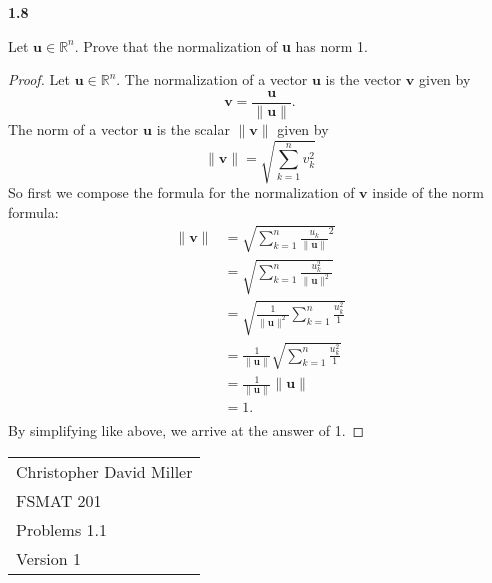 \documentclass[12pt]{article}
\begin{document}
\textbf{1.8} \\  %
\begin{prop}
Let $\mathbf{u} \in \mathbb{R}^n$. Prove that the normalization of \textbf{u} has norm 1.
\end{prop}
\begin{proof}
    Let $\mathbf{u} \in \mathbb{R}^n$.
    The normalization of a vector $\mathbf{u}$ is the vector $\mathbf{v}$ given by   
    \[\mathbf{v} = \frac{\mathbf{u}}{\| \mathbf{u} \|}.\] 
    The norm of a vector $\mathbf{u}$ is the scalar $\|  \mathbf{v} \|$ given by   
    $$\|  \mathbf{v} \| = \sqrt{\sum_{k=1}^{n}v_k^2}$$ 
    So first we compose the formula for the normalization of $\mathbf{v}$ inside of the norm formula:
        \begin{align*}
          \|  \mathbf{v} \| &=  \sqrt{\sum_{k=1}^{n}\frac{u_k}{\| \mathbf{u} \|}^2} \\ 
                            &=  \sqrt{\sum_{k=1}^{n}\frac{u_k^2}{\| \mathbf{u} \|^2}} \\ 
                            &=  \sqrt{\frac{1}{\| \mathbf{u} \|^2}\sum_{k=1}^{n}\frac{u_k^2}{1}} \\
                            &=  \frac{1}{\| \mathbf{u} \|}\sqrt{\sum_{k=1}^{n}\frac{u_k^2}{1}} \\
                            &=  \frac{1}{\| \mathbf{u} \|} \| \mathbf{u} \| \\
                            &=  1. \\
        \end{align*}
        By simplifying like above, we arrive at the answer of 1.  
\end{proof}
\newpage
\begin{flushright}
    \begin{tabular}{l}
    Christopher David Miller \\  %
    FSMAT 201 \\  %
    Problems 1.1 \\  %
    Version 1 \\ %
    \end{tabular}
    \end{flushright}
    \vspace{20pt}  %
    
\end{document}
